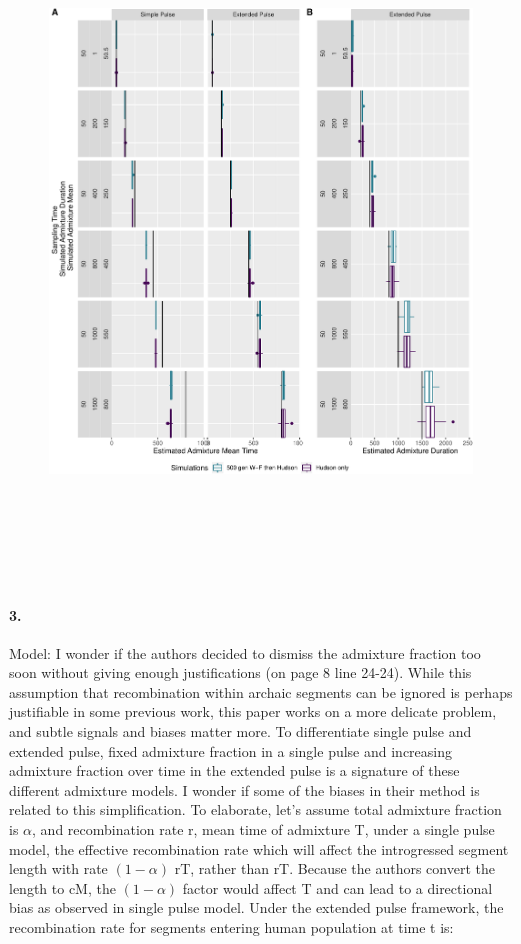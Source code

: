 \documentclass[11pt]{article}
\let\oldparagraph\paragraph
\renewcommand{\paragraph}[1]{\oldparagraph{#1}\mbox{}}
\begin{document}
\begin{figure}
\centering
\includegraphics[width=16cm,height=18cm,keepaspectratio]{ATE_Revisions_files/figure-latex/figResult_WF_H_comp-1.pdf}
\caption{\label{fig:fig_R} }
\end{figure}

\paragraph{3.}
Model: I wonder if the authors decided to dismiss the admixture fraction too soon without giving enough justifications (on page 8 line 24-24). While this assumption that recombination within archaic segments can be ignored is perhaps justifiable in some previous work, this paper works on a more delicate problem, and subtle signals and biases matter more. To differentiate single pulse and extended pulse, fixed admixture fraction in a single pulse and increasing admixture fraction over time in the extended pulse is a signature of these different admixture models. I wonder if some of the biases in their method is related to this simplification. To elaborate, let’s assume total admixture fraction is $\alpha$, and recombination rate r, mean time of admixture T, under a single pulse model, the effective recombination rate which will affect the introgressed segment length with rate $(1-\alpha)$ rT, rather than rT. Because the authors convert the length to cM, the $(1-\alpha)$ factor would affect T and can lead to a directional bias as observed in single pulse model. Under the extended pulse framework, the recombination rate for segments entering human population at time t is:
\end{document}
